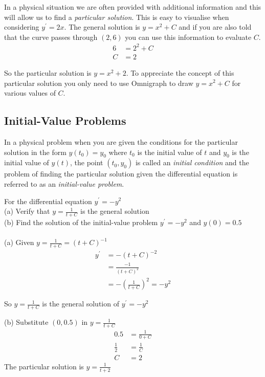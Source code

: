 In a physical situation we are often provided with additional information and this will allow us to find a \emph{particular solution}.  This is easy to visualise when considering $y^{ \prime } =2 x\text{.}$  The general solution is $y =x^{2} +C$ and if you are also told that the curve passes through $\left (2 ,6\right )$ you can use this information to evaluate $C\text{.}$
\begin{align*}6 &    = 2^{2} +C \\
C &    = 2\end{align*}

So the particular solution is $y =x^{2} +2$.  To appreciate the concept of this particular solution you only need to use Omnigraph to
draw $y =x^{2} +C$ for various values of $C$. 

\subsection*{Initial-Value Problems}
In a physical problem when you are given the conditions for the particular solution in the form $y (t_{0}) =y_{0}$ where $t_{0}$ is the initial value of $t$ and $y_{0}$ is the initial value of $y (t)$, the point $\left (t_{0} ,y_{0}\right )$ is called an \emph{initial condition} and the
problem of finding the particular solution given the differential equation is referred to as an \emph{initial-value problem}. 

\example For the differential equation $y^{ \prime } = -y^{2}$ \medskip\\
(a) Verify that $y =\frac{1}{t +C}$ is the general solution \\
(b) Find the solution of the initial-value problem $y^{ \prime } = -y^{2}$ and $y \left (0\right ) =0.5$ \\
\solution\medskip\\
(a) Given $y =\frac{1}{t +C} =\left (t +C\right )^{ -1}$
\begin{align*}y^{ \prime } &    =  -\left (t +C\right )^{ -2} \\
 &    = \frac{ -1}{\left (t +C\right )^{2}} \\
 &    =  -\genfrac{(}{)}{}{}{1}{t +C}^{2} = -y^{2}\end{align*}

So $y =\frac{1}{t +C}$ is the general solution of $y^{ \prime } = -y^{2}$ 

(b) Substitute $\left (0 ,0.5\right )$ in $y =\frac{1}{t +C}$
\begin{align*}0.5 &    = \frac{1}{0 +C} \\
\frac{1}{2} &    = \frac{1}{C} \\
C &    = 2\end{align*}
The particular solution is $y =\frac{1}{t +2}$ 

